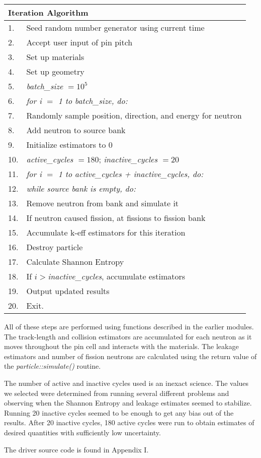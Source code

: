 \begin{center}
\begin{tabular}{l|l}
\multicolumn{2}{l}{Iteration Algorithm} \\ \hline\hline
1.  & Seed random number generator using current time \\
2.  & Accept user input of pin pitch \\
3.  & Set up materials \\
4.  & Set up geometry \\
5.  & \textit{batch{\_}size} $=10^5$ \\
6.  & \textit{for i $=$ 1 to batch{\_}size, do:} \\
7.  & \quad Randomly sample position, direction, and energy for neutron \\
8.  & \quad Add neutron to source bank \\
9.  & Initialize estimators to 0 \\
10. & \textit{active{\_}cycles $=180$}; \textit{inactive{\_}cycles $=20$} \\
11. & \textit{for i $=$ 1 to active{\_}cycles + inactive{\_}cycles, do:} \\
12. & \quad \textit{while source bank is empty, do:} \\
13. & \quad\quad Remove neutron from bank and simulate it \\
14. & \quad\quad If neutron caused fission, at fissions to fission bank \\
15. & \quad\quad Accumulate k-eff estimators for this iteration \\
16. & \quad\quad Destroy particle \\
17. & \quad Calculate Shannon Entropy \\
18. & \quad If $i > $\textit{inactive{\_}cycles}, accumulate estimators \\
19. & \quad Output updated results \\
20. & Exit.
\end{tabular}
\end{center}

All of these steps are performed using functions described in the earlier modules.  The track-length and collision estimators are accumulated for each neutron as it moves throughout the pin cell and interacts with the materials.  The leakage estimators and number of fission neutrons are calculated using the return value of the \textit{particle::simulate()} routine.

The number of active and inactive cycles used is an inexact science.  The values we selected were determined from running several different problems and observing when the Shannon Entropy and leakage estimates seemed to stabilize.  Running 20 inactive cycles seemed to be enough to get any bias out of the results.  After 20 inactive cycles, 180 active cycles were run to obtain estimates of desired quantities with sufficiently low uncertainty.

The driver source code is found in Appendix I.

